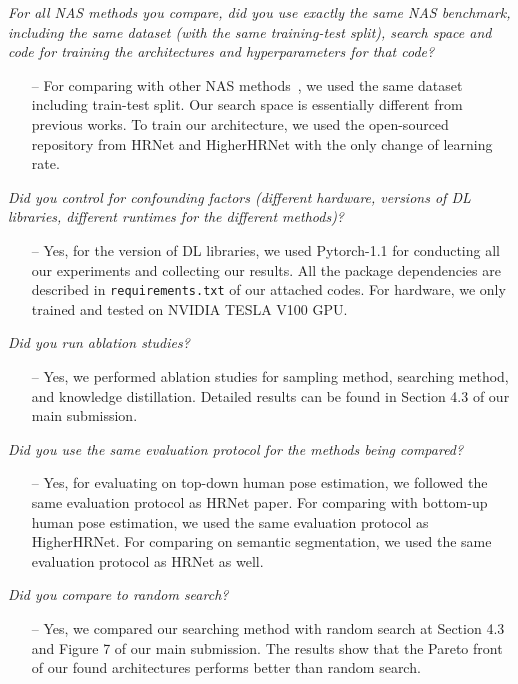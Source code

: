 \documentclass[final]{cvpr}
\begin{document}
\begin{todolist}
    \item[\done] \textit{For all NAS methods you compare, did you use exactly the same NAS benchmark, including the same dataset (with the same training-test split), search space and code for training the architectures and hyperparameters for that code?}
    \begin{itemize}
        \item [--]  
        For comparing with other NAS methods~\cite{gong2020autopose,li2020learning}, we used the same dataset including train-test split. Our search space is essentially different from previous works. To train our architecture, we used the open-sourced repository from HRNet and HigherHRNet with the only change of learning rate. 
    \end{itemize}

    \item[\done] \textit{Did you control for confounding factors (different hardware, versions of DL libraries, different runtimes for the different methods)?} 
    \begin{itemize}
        \item [--] Yes, for the version of DL libraries, we used Pytorch-1.1 for conducting all our experiments and collecting our results. All the package dependencies are described in \texttt{requirements.txt} of our attached codes. For hardware, we only trained and tested on NVIDIA TESLA V100 GPU. 
    \end{itemize}
    
    \item[\done] \textit{Did you run ablation studies?} 
    \begin{itemize}
        \item [--]     Yes, we performed ablation studies for sampling method, searching method, and knowledge distillation. Detailed results can be found in Section 4.3 of our main submission.
        \end{itemize}
        
    \item[\done] \textit{Did you use the same evaluation protocol for the methods being compared?}
    \begin{itemize}
        \item [--] Yes, for evaluating on top-down human pose estimation, we followed the same evaluation protocol as HRNet paper. For comparing with bottom-up human pose estimation, we used the same evaluation protocol as HigherHRNet. For comparing on semantic segmentation, we used the same evaluation protocol as HRNet as well. 
    \end{itemize}
    \item[\done] \textit{Did you compare to random search?}
    \begin{itemize}
        \item  [--] Yes, we compared our searching method with random search at Section 4.3 and Figure 7 of our main submission. The results show that the Pareto front of our found architectures performs better than random search. 
    \end{itemize}


\end{todolist}
\end{document}
